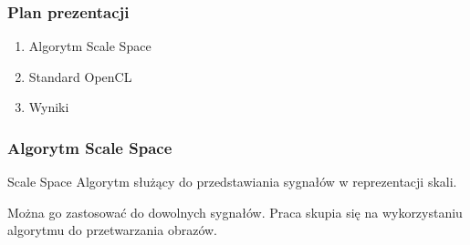 
\begin{frame}
	\frametitle{Plan prezentacji}

	\begin{enumerate}
		\item Algorytm Scale Space
		\item Standard OpenCL
		\item Wyniki
	\end{enumerate}

\end{frame}




\begin{frame}
	\frametitle{Algorytm Scale Space}
	\begin{block}{Scale Space}
		Algorytm służący do przedstawiania sygnałów w reprezentacji skali.
	\end{block}
	Można go zastosować do dowolnych sygnałów. Praca skupia się na wykorzystaniu algorytmu do przetwarzania obrazów.

\end{frame}

